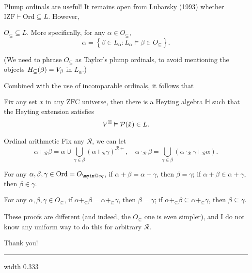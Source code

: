 \documentclass{beamer}
\makeatletter
\newcommand{\IZF}{\mathrm{IZF}}
\newcommand{\ZFC}{\mathrm{ZFC}}
\newcommand{\Ord}{\mathrm{Ord}}
\def\myineq{\mathrel{\mathpalette\myin@eq\relax}}
\def\myin@eq#1#2{%
  \setbox\myin@eqfst=\hbox{\m@th$#1\in$}%
  \setbox\myin@eqsnd=\hb@xt@\wd\myin@eqfst{\m@th$#1\dabar@$\hss$#1\dabar@$}%
  \vcenter{\offinterlineskip%
    \box\myin@eqfst\vskip-.1\ht\myin@eqsnd%
    \copy\myin@eqsnd\vskip-.5\ht\myin@eqsnd}}
\makeatother
\begin{document}
\begin{frame}{Plump ordinals are useful!}
  It remains open from Lubarsky (1993) whether $\IZF \vdash \Ord \subseteq L$. However,
  \begin{theorem}
    $O_\subseteq \subseteq L$. More specifically, for any $\alpha \in O_\subseteq$,
    \[\alpha = \left\{\beta \in L_\alpha : L_\alpha \vDash \beta \in O_\subseteq\right\}.\]
  \end{theorem}
  (We need to phrase $O_\subseteq$ as Taylor's plump ordinals, to avoid mentioning the objects $H_\subseteq\mleft(\beta\mright) = V_\beta$ in $L_\alpha$.)

  \pause

  \vspace{0.4em}

  Combined with the use of incomparable ordinals, it follows that
  \begin{theorem}[W., 2026]
    Fix any set $x$ in any $\ZFC$ universe, then there is a Heyting algebra $\mathbb{H}$ such that the Heyting extension satisfies
    \[V^\mathbb{H} \vDash \mathcal{P}\mleft(\check{x}\mright) \in L.\]
  \end{theorem}
\end{frame}

\begin{frame}{Ordinal arithmetic}
  Fix any $\mathscr{R}$, we can let
  \[\alpha +_\mathscr{R} \beta = \alpha \cup \bigcup_{\gamma \in \beta} \left(\alpha +_\mathscr{R} \gamma\right)^{\mathscr{R}+}, \quad \alpha \cdot_\mathscr{R} \beta = \bigcup_{\gamma \in \beta} \left(\alpha \cdot_\mathscr{R} \gamma +_\mathscr{R} \alpha\right).\]

  \pause

  \begin{lemma}
    For any $\alpha, \beta, \gamma \in \Ord = O_{\myineq}$, if $\alpha + \beta = \alpha + \gamma$, then $\beta = \gamma$; if $\alpha + \beta \in \alpha + \gamma$, then $\beta \in \gamma$.
  \end{lemma}

  \begin{lemma}[W., 2026]
    For any $\alpha, \beta, \gamma \in O_\subseteq$, if $\alpha +_\subseteq \beta = \alpha +_\subseteq \gamma$, then $\beta = \gamma$; if $\alpha +_\subseteq \beta \subseteq \alpha +_\subseteq \gamma$, then $\beta \subseteq \gamma$.
  \end{lemma}

  \pause

  \vspace{0.4em}

  These proofs are different (and indeed, the $O_\subseteq$ one is even simpler), and I do not know any uniform way to do this for arbitrary $\mathscr{R}$.
\end{frame}

\begin{frame}[b]
  \relax %
  {\Large{} Thank you!}

  \vfill

  \let\oldbiblist\biblist
  \def\biblist{\oldbiblist\footnotesize}
  \hrule width 0.333\textwidth
  \bibmain
\end{frame}
\end{document}

